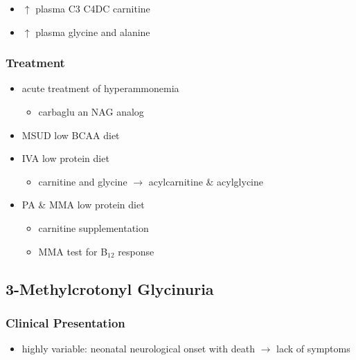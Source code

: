 \documentclass{scrartcl}
\begin{document}
\begin{enumerate}
\begin{itemize}
\item \(\uparrow\) plasma C3 \textpm{} C4DC carnitine
\item \(\uparrow\) plasma glycine and alanine
\end{itemize}
\end{enumerate}

\subsubsection{Treatment}
\label{sec:org2f88635}
\begin{itemize}
\item acute treatment of hyperammonemia
\begin{itemize}
\item carbaglu an NAG analog
\end{itemize}
\item MSUD low BCAA diet
\item IVA low protein diet
\begin{itemize}
\item carnitine and glycine \(\to\) acylcarnitine \& acylglycine
\end{itemize}
\item PA \& MMA low protein diet
\begin{itemize}
\item carnitine supplementation
\item MMA test for B\(_{\text{12}}\) response
\end{itemize}
\end{itemize}

\subsection{3-Methylcrotonyl Glycinuria}
\label{sec:org54297ae}
\subsubsection{Clinical Presentation}
\label{sec:org65f6400}
\begin{itemize}
\item highly variable: neonatal neurological onset with death \(\to\) lack of symptoms
\end{itemize}
\end{document}
